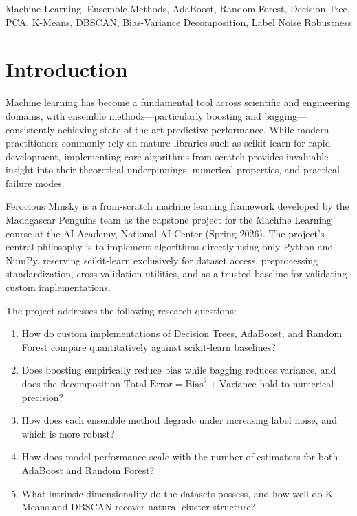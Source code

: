 \documentclass[conference,12pt]{IEEEtran}
\begin{document}
\begin{IEEEkeywords}
Machine Learning, Ensemble Methods, AdaBoost, Random Forest, Decision Tree, PCA, K-Means, DBSCAN, Bias-Variance Decomposition, Label Noise Robustness
\end{IEEEkeywords}

\section{Introduction}

Machine learning has become a fundamental tool across scientific and engineering domains, with ensemble methods---particularly boosting and bagging---consistently achieving state-of-the-art predictive performance. While modern practitioners commonly rely on mature libraries such as scikit-learn for rapid development, implementing core algorithms from scratch provides invaluable insight into their theoretical underpinnings, numerical properties, and practical failure modes.

Ferocious Minsky is a from-scratch machine learning framework developed by the Madagascar Penguins team as the capstone project for the Machine Learning course at the AI Academy, National AI Center (Spring 2026). The project's central philosophy is to implement algorithms directly using only Python and NumPy, reserving scikit-learn exclusively for dataset access, preprocessing standardization, cross-validation utilities, and as a trusted baseline for validating custom implementations.

The project addresses the following research questions:
\begin{enumerate}
    \item How do custom implementations of Decision Trees, AdaBoost, and Random Forest compare quantitatively against scikit-learn baselines?
    \item Does boosting empirically reduce bias while bagging reduces variance, and does the decomposition $\text{Total Error} = \text{Bias}^2 + \text{Variance}$ hold to numerical precision?
    \item How does each ensemble method degrade under increasing label noise, and which is more robust?
    \item How does model performance scale with the number of estimators for both AdaBoost and Random Forest?
    \item What intrinsic dimensionality do the datasets possess, and how well do K-Means and DBSCAN recover natural cluster structure?
\end{enumerate}
\end{document}
